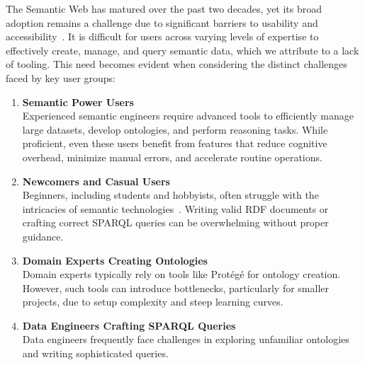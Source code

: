The Semantic Web has matured over the past two decades, yet its broad adoption remains a challenge due to significant barriers to usability and accessibility~\cite{10.3233/SW-190387}. 
It is difficult for users across varying levels of expertise to effectively create, manage, and query semantic data, which we attribute to a lack of tooling.
This need becomes evident when considering the distinct challenges faced by key user groups:

\begin{enumerate}
  \item \textbf{Semantic Power Users}\\
    Experienced semantic engineers require advanced tools to efficiently manage large datasets, develop ontologies, and perform reasoning tasks.
    While proficient, even these users benefit from features that reduce cognitive overhead, minimize manual errors, and accelerate routine operations.

  \item \textbf{Newcomers and Casual Users}\\
    Beginners, including students and hobbyists, often struggle with the intricacies of semantic technologies~\cite{EvensteinSigalov2023,Turki2021RepresentingCI}. 
    Writing valid RDF documents or crafting correct SPARQL queries can be overwhelming without proper guidance. 

\item \textbf{Domain Experts Creating Ontologies}\\
    Domain experts typically rely on tools like Protégé for ontology creation. 
    However, such tools can introduce bottlenecks, particularly for smaller projects, due to setup complexity and steep learning curves. 

  \item \textbf{Data Engineers Crafting SPARQL Queries}\\
    Data engineers frequently face challenges in exploring unfamiliar ontologies and writing sophisticated queries. 
\end{enumerate}

